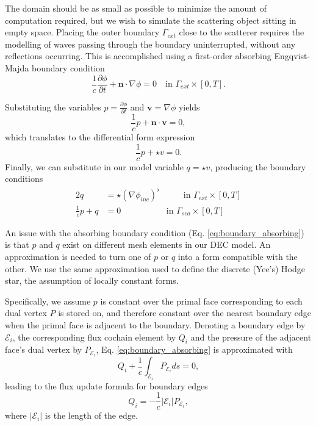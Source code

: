 \documentclass[utf8,english]{gradu3}
\begin{document}
The domain should be as small as possible
to minimize the amount of computation required,
but we wish to simulate the scattering object sitting in empty space.
Placing the outer boundary $\Gamma_{ext}$ close to the scatterer
requires the modelling of waves passing through the boundary uninterrupted,
without any reflections occurring.
This is accomplished using a first-order absorbing Engqvist-Majda boundary condition
\parencite{engquist_absorbing_1977}
\[
  \frac{1}{c}\frac{\partial\phi}{\partial t} + \mathbf{n} \cdot \nabla\phi = 0
  \quad \text{in } \Gamma_{ext} \times [0, T].
\]

Substituting the variables $p = \frac{\partial \phi}{\partial t}$
and $\mathbf{v} = \nabla \phi$ yields
\[
  \frac{1}{c}p + \mathbf{n} \cdot \mathbf{v} = 0,
\]
which translates to the differential form expression
\[
  \frac{1}{c}p + \star v = 0.
\]
Finally, we can substitute in our model variable $q = \star v$,
producing the boundary conditions
\begin{alignat}{2}
  \label{eq:boundary_dirichlet}
  q &= \star(\nabla \phi_{inc})^{\flat} & \qquad \text{in } \Gamma_{ext} \times [0, T] \\
  \label{eq:boundary_absorbing}
  \frac{1}{c} p + q &= 0 & \text{in } \Gamma_{sca} \times [0, T]
\end{alignat}

An issue with the absorbing boundary condition (Eq. \eqref{eq:boundary_absorbing})
is that $p$ and $q$ exist on different mesh elements in our DEC model.
An approximation is needed to turn one of $p$ or $q$ into a form compatible with the other.
We use the same approximation used to define the discrete (Yee's) Hodge star,
the assumption of locally constant forms.

Specifically, we assume $p$ is constant over the primal face corresponding
to each dual vertex $P$ is stored on,
and therefore constant over the nearest boundary edge
when the primal face is adjacent to the boundary.
Denoting a boundary edge by $\mathcal{E}_i$,
the corresponding flux cochain element by $Q_i$
and the pressure of the adjacent face's dual vertex by $P_{\mathcal{E}_i}$,
Eq. \eqref{eq:boundary_absorbing} is approximated with
\[
  Q_i + \frac{1}{c} \int_{\mathcal{E}_i} P_{\mathcal{E}_i} ds = 0,
\]
leading to the flux update formula for boundary edges
\begin{equation}
  Q_i = -\frac{1}{c} |\mathcal{E}_i| P_{\mathcal{E}_i},
\end{equation}
where $|\mathcal{E}_i|$ is the length of the edge.
\end{document}
